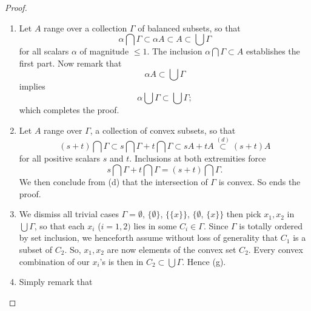 \begin{proof}
\begin{enumerate}[item-label=(\alph{enumi})]
\begin{equation}
  sA + (1-s)A = A.
\end{equation}
%
The latter extends to $s=0$, since %
%
\begin{equation}
  0A + A \overset{(b)}{=}\{0\}+A=A.
\end{equation}
%
The extension to $s=1$ is analogously established %
(or simply use the fact that $+$ is commutative!).
So ends the proof. %
\item Let $A$ range over a collection $\Gamma$ of balanced subsets, so that %
%
\begin{equation}
  \alpha \bigcap \Gamma \subset \alpha A \subset A \subset \bigcup \Gamma
\end{equation}
%
for all scalars $\alpha$ of magnitude $\leq 1$. %
The inclusion $\alpha \bigcap \Gamma \subset A$ establishes the first part. %
Now remark that %
%
\begin{equation}
  \alpha A  \subset \bigcup \Gamma
\end{equation}
%
implies %
%
\begin{equation}
  \alpha \bigcup \Gamma \subset \bigcup \Gamma;
\end{equation}
which completes the proof. %
%
\item Let $A$ range over $\Gamma$, a collection of convex subsets, so that %
%
\begin{equation}
  (s+t) \bigcap \Gamma \subset s\bigcap \Gamma + t\bigcap \Gamma \subset sA + tA 
  \overset{(d)}{\subset} (s+t)A
\end{equation}
%
for all positive scalars $s$ and $t$. Inclusions at both extremities force %
%
\begin{equation}
  s\bigcap \Gamma + t\bigcap \Gamma = (s+t) \bigcap \Gamma.
\end{equation}
%
We then conclude from (d) that the intersection of $\Gamma$ is convex. %
So ends the proof.
\item We dismiss all trivial cases %
%
  $\Gamma = \emptyset$, %
  $\{ \emptyset\}$, %
  $\{\{x\}\}$, %
  $\{\emptyset$, %
  $\{x\}\}$ %
%
then pick $x_1, x_2$ in $\bigcup \Gamma$, 
so that each $x_i$ ($i=1, 2)$ lies in some $C_i \in \Gamma$. %
%
Since $\Gamma$ is totally ordered by set inclusion, we henceforth assume %
without loss of generality that $C_1$ is a subset of $C_2$. %
%
So, $x_1, x_2$ are now elements of the convex set $C_2$. %
Every convex combination of our $x_i$'s is then in %
$C_2 \subset \bigcup \Gamma$. Hence (g). %
%
\item Simply remark that 
%
\begin{equation}

\end{equation}
\end{enumerate}
\end{proof}
